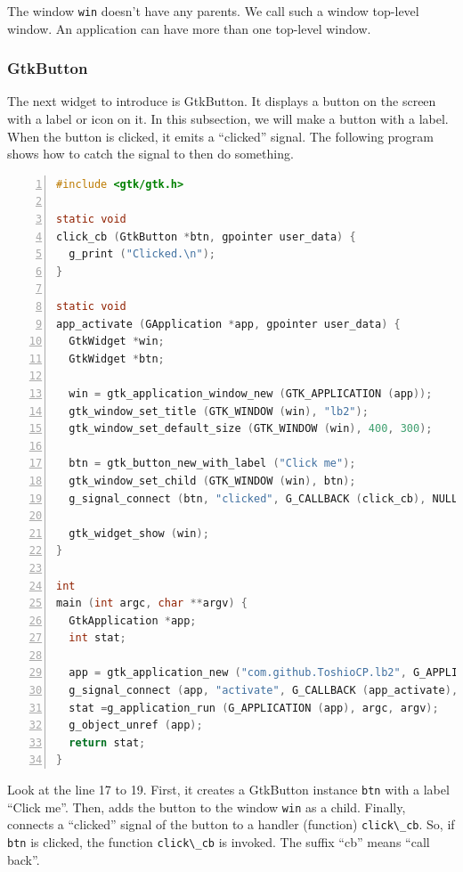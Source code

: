 The window \passthrough{\lstinline!win!} doesn't have any parents. We
call such a window top-level window. An application can have more than
one top-level window.

\hypertarget{gtkbutton}{%
\subsubsection{GtkButton}\label{gtkbutton}}

The next widget to introduce is GtkButton. It displays a button on the
screen with a label or icon on it. In this subsection, we will make a
button with a label. When the button is clicked, it emits a ``clicked''
signal. The following program shows how to catch the signal to then do
something.

\begin{lstlisting}[language=C, numbers=left]
#include <gtk/gtk.h>

static void
click_cb (GtkButton *btn, gpointer user_data) {
  g_print ("Clicked.\n");
}

static void
app_activate (GApplication *app, gpointer user_data) {
  GtkWidget *win;
  GtkWidget *btn;

  win = gtk_application_window_new (GTK_APPLICATION (app));
  gtk_window_set_title (GTK_WINDOW (win), "lb2");
  gtk_window_set_default_size (GTK_WINDOW (win), 400, 300);

  btn = gtk_button_new_with_label ("Click me");
  gtk_window_set_child (GTK_WINDOW (win), btn);
  g_signal_connect (btn, "clicked", G_CALLBACK (click_cb), NULL);

  gtk_widget_show (win);
}

int
main (int argc, char **argv) {
  GtkApplication *app;
  int stat;

  app = gtk_application_new ("com.github.ToshioCP.lb2", G_APPLICATION_FLAGS_NONE);
  g_signal_connect (app, "activate", G_CALLBACK (app_activate), NULL);
  stat =g_application_run (G_APPLICATION (app), argc, argv);
  g_object_unref (app);
  return stat;
}
\end{lstlisting}

Look at the line 17 to 19. First, it creates a GtkButton instance
\passthrough{\lstinline!btn!} with a label ``Click me''. Then, adds the
button to the window \passthrough{\lstinline!win!} as a child. Finally,
connects a ``clicked'' signal of the button to a handler (function)
\passthrough{\lstinline!click\_cb!}. So, if
\passthrough{\lstinline!btn!} is clicked, the function
\passthrough{\lstinline!click\_cb!} is invoked. The suffix ``cb'' means
``call back''.

